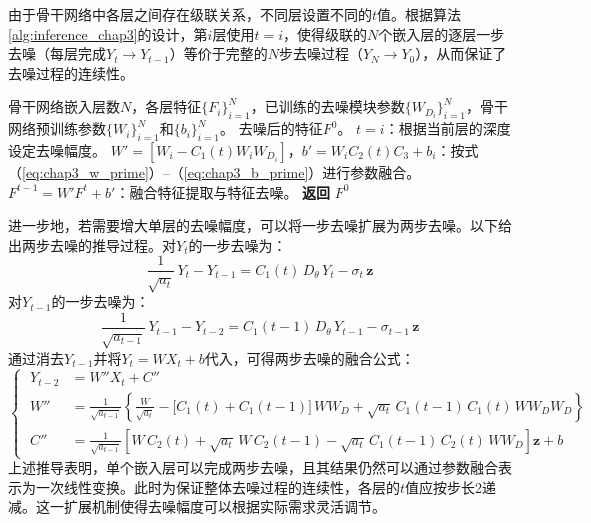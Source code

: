 由于骨干网络中各层之间存在级联关系，不同层设置不同的$t$值。根据算法\ref{alg:inference_chap3}的设计，第$i$层使用$t = i$，使得级联的$N$个嵌入层的逐层一步去噪（每层完成$Y_t \rightarrow Y_{t-1}$）等价于完整的$N$步去噪过程（$Y_N \rightarrow Y_0$），从而保证了去噪过程的连续性。

\begin{algorithm}[htbp]
\caption{参数融合推理算法}
\label{alg:inference_chap3}
\begin{algorithmic}[1]
\REQUIRE 骨干网络嵌入层数$N$，各层特征$\{F_i\}_{i=1}^{N}$，已训练的去噪模块参数$\{W_{D_i}\}_{i=1}^{N}$，骨干网络预训练参数$\{W_i\}_{i=1}^{N}$和$\{b_i\}_{i=1}^{N}$。
\ENSURE 去噪后的特征$F^0$。
\STATE $t = i$：根据当前层的深度设定去噪幅度。
\STATE $W' = \left[W_i - C_1(t)W_iW_{D_i}\right]$，$b' = W_iC_2(t)C_3 + b_i$：按式（\ref{eq:chap3_w_prime}）--（\ref{eq:chap3_b_prime}）进行参数融合。
\STATE $F^{t-1} = W'F^t + b'$：融合特征提取与特征去噪。
\ENDFOR
\STATE \textbf{返回} $F^0$
\end{algorithmic}
\end{algorithm}

进一步地，若需要增大单层的去噪幅度，可以将一步去噪扩展为两步去噪。以下给出两步去噪的推导过程。对$Y_t$的一步去噪为：
\begin{equation}
\frac{1}{\sqrt{a_t}}\,Y_t - Y_{t-1} = C_1(t)\,D_\theta\, Y_t - \sigma_t\,\mathbf{z}
\label{eq:chap3_two_step_1}
\end{equation}
对$Y_{t-1}$的一步去噪为：
\begin{equation}
\frac{1}{\sqrt{a_{t-1}}}\,Y_{t-1} - Y_{t-2} = C_1(t\!-\!1)\,D_\theta\, Y_{t-1} - \sigma_{t-1}\,\mathbf{z}
\label{eq:chap3_two_step_2}
\end{equation}
通过消去$Y_{t-1}$并将$Y_t = WX_t + b$代入，可得两步去噪的融合公式：
\begin{equation}
\left\{\;\begin{aligned}
Y_{t-2} &= W''X_t + C'' \\[6pt]
W'' &= \frac{1}{\sqrt{a_{t-1}}}\!\left\{\frac{W}{\sqrt{a_t}} - \bigl[C_1(t) + C_1(t\!-\!1)\bigr]\,WW_D + \sqrt{a_t}\,C_1(t\!-\!1)\,C_1(t)\,WW_DW_D\right\} \\[6pt]
C'' &= \frac{1}{\sqrt{a_{t-1}}}\!\left[W\,C_2(t) + \sqrt{a_t}\,W\,C_2(t\!-\!1) - \sqrt{a_t}\,C_1(t\!-\!1)\,C_2(t)\,WW_D\right]\mathbf{z} + b
\end{aligned}\right.
\label{eq:chap3_two_step_combined}
\end{equation}
上述推导表明，单个嵌入层可以完成两步去噪，且其结果仍然可以通过参数融合表示为一次线性变换。此时为保证整体去噪过程的连续性，各层的$t$值应按步长2递减。这一扩展机制使得去噪幅度可以根据实际需求灵活调节。

